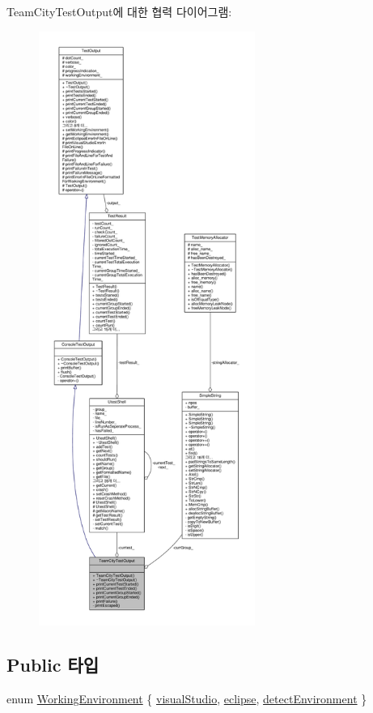 Team\+City\+Test\+Output에 대한 협력 다이어그램\+:
\nopagebreak
\begin{figure}[H]
\begin{center}
\leavevmode
\includegraphics[height=550pt]{class_team_city_test_output__coll__graph}
\end{center}
\end{figure}
\subsection*{Public 타입}
\begin{DoxyCompactItemize}
\item 
enum \hyperlink{class_test_output_a0541851f863713454486a9fb3080f766}{Working\+Environment} \{ \hyperlink{class_test_output_a0541851f863713454486a9fb3080f766a47f3a5b9ed4237588024b983a4ca8399}{visual\+Studio}, 
\hyperlink{class_test_output_a0541851f863713454486a9fb3080f766abf6505364f680c2682d5648cd0c76f53}{eclipse}, 
\hyperlink{class_test_output_a0541851f863713454486a9fb3080f766a3f11f791db94db142e33c3c75442ed10}{detect\+Environment}
 \}
\end{DoxyCompactItemize}
